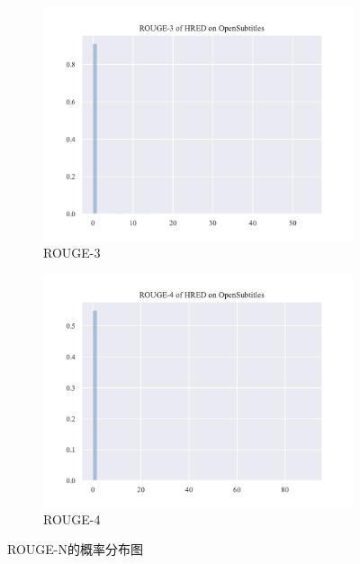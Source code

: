 \begin{figure}[H]
\begin{subfigure}{0.5\linewidth}
        \includegraphics[width=\linewidth]{figure/distplot/opensub/hred/rouge_3/plot.pdf}
        \caption{ROUGE-3}
    \end{subfigure}%
    \begin{subfigure}{0.5\linewidth}
        \centering
        \includegraphics[width=\linewidth]{figure/distplot/opensub/hred/rouge_4/plot.pdf}
        \caption{ROUGE-4}
    \end{subfigure}
    \centering
    \caption{ROUGE-N的概率分布图}
    \label{fig:ROUGE_N_dist}
\end{figure}
